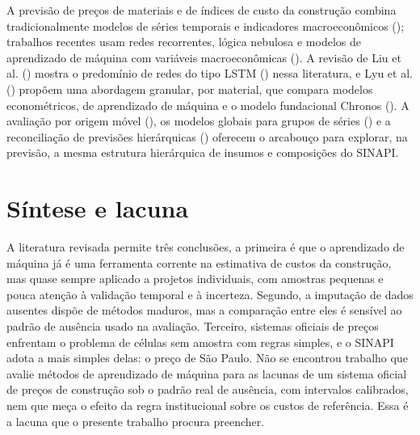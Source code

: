 A previsão de preços de materiais e de índices de custo da construção combina tradicionalmente
modelos de séries temporais e indicadores macroeconômicos (); trabalhos recentes usam redes recorrentes, lógica nebulosa
e modelos de aprendizado de máquina com variáveis macroeconômicas (). A revisão de Liu et al. () mostra o
predomínio de redes do tipo LSTM () nessa literatura,
e Lyu et al. () propõem uma abordagem granular, por material, que compara modelos
econométricos, de aprendizado de máquina e o modelo fundacional Chronos (). A avaliação por origem móvel (), os modelos globais para grupos de
séries () e a reconciliação de previsões hierárquicas
() oferecem o arcabouço
para explorar, na previsão, a mesma estrutura hierárquica de insumos e composições do SINAPI.

\section{Síntese e lacuna}

A literatura revisada permite três conclusões, a primeira é que o aprendizado de máquina já é 
uma ferramenta corrente na estimativa de custos da construção, mas quase sempre aplicado a 
projetos individuais, com amostras pequenas e pouca atenção à validação temporal e à 
incerteza. Segundo, a imputação de dados ausentes dispõe de métodos maduros, mas a 
comparação entre eles é sensível ao padrão de ausência usado na avaliação. Terceiro, 
sistemas oficiais de preços enfrentam o problema de células sem amostra com regras 
simples, e o SINAPI adota a mais simples delas: o preço de São Paulo. Não se encontrou 
trabalho que avalie métodos de aprendizado de máquina para as lacunas de um sistema 
oficial de preços de construção sob o padrão real de ausência, com intervalos calibrados, 
nem que meça o efeito da regra institucional sobre os custos de referência. Essa é a 
lacuna que o presente trabalho procura preencher.




